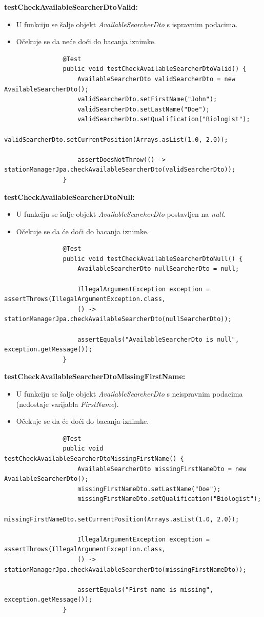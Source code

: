 			\textbf{testCheckAvailableSearcherDtoValid:}
			\begin{itemize}
				\item U funkciju se šalje objekt \textit{AvailableSearcherDto} s ispravnim podacima.
				\item Očekuje se da neće doći do bacanja iznimke.
			\end{itemize}
			\begin{lstlisting}
				@Test
				public void testCheckAvailableSearcherDtoValid() {
					AvailableSearcherDto validSearcherDto = new AvailableSearcherDto();
					validSearcherDto.setFirstName("John");
					validSearcherDto.setLastName("Doe");
					validSearcherDto.setQualification("Biologist");
					validSearcherDto.setCurrentPosition(Arrays.asList(1.0, 2.0));
					
					assertDoesNotThrow(() -> stationManagerJpa.checkAvailableSearcherDto(validSearcherDto));
				}
			\end{lstlisting}
			
			\textbf{testCheckAvailableSearcherDtoNull:}
			\begin{itemize}
				\item U funkciju se šalje objekt \textit{AvailableSearcherDto} postavljen na \textit{null}.
				\item Očekuje se da će doći do bacanja iznimke.
			\end{itemize}
			\begin{lstlisting}
				@Test
				public void testCheckAvailableSearcherDtoNull() {
					AvailableSearcherDto nullSearcherDto = null;
					
					IllegalArgumentException exception = assertThrows(IllegalArgumentException.class,
					() -> stationManagerJpa.checkAvailableSearcherDto(nullSearcherDto));
					
					assertEquals("AvailableSearcherDto is null", exception.getMessage());
				}
			\end{lstlisting}
			
			\textbf{testCheckAvailableSearcherDtoMissingFirstName:}
			\begin{itemize}
				\item U funkciju se šalje objekt \textit{AvailableSearcherDto} s neispravnim podacima (nedostaje varijabla \textit{FirstName}).
				\item Očekuje se da će doći do bacanja iznimke.
			\end{itemize}
			\begin{lstlisting}
				@Test
				public void testCheckAvailableSearcherDtoMissingFirstName() {
					AvailableSearcherDto missingFirstNameDto = new AvailableSearcherDto();
					missingFirstNameDto.setLastName("Doe");
					missingFirstNameDto.setQualification("Biologist");
					missingFirstNameDto.setCurrentPosition(Arrays.asList(1.0, 2.0));
					
					IllegalArgumentException exception = assertThrows(IllegalArgumentException.class,
					() -> stationManagerJpa.checkAvailableSearcherDto(missingFirstNameDto));
					
					assertEquals("First name is missing", exception.getMessage());
				}
			\end{lstlisting}
			
